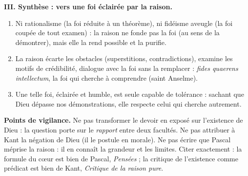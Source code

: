 \documentclass[11pt]{article}
\begin{document}
\begin{corrige}
\textbf{III. Synthèse : vers une foi éclairée par la raison.}
\begin{enumerate}
\item Ni rationalisme (la foi réduite à un théorème), ni fidéisme aveugle (la foi coupée de tout examen) : la raison ne fonde pas la foi (au sens de la démontrer), mais elle la rend possible et la purifie.
\item La raison écarte les obstacles (superstitions, contradictions), examine les motifs de crédibilité, dialogue avec la foi sans la remplacer : \emph{fides quaerens intellectum}, la foi qui cherche à comprendre (saint Anselme).
\item Une telle foi, éclairée et humble, est seule capable de tolérance : sachant que Dieu dépasse nos démonstrations, elle respecte celui qui cherche autrement.
\end{enumerate}

\textbf{Points de vigilance.} Ne pas transformer le devoir en exposé sur l'existence de Dieu : la question porte sur le \emph{rapport} entre deux facultés. Ne pas attribuer à Kant la négation de Dieu (il le postule en morale). Ne pas écrire que Pascal méprise la raison : il en connaît la grandeur et les limites. Citer exactement : la formule du cœur est bien de Pascal, \emph{Pensées} ; la critique de l'existence comme prédicat est bien de Kant, \emph{Critique de la raison pure}.
\end{corrige}
\end{document}
